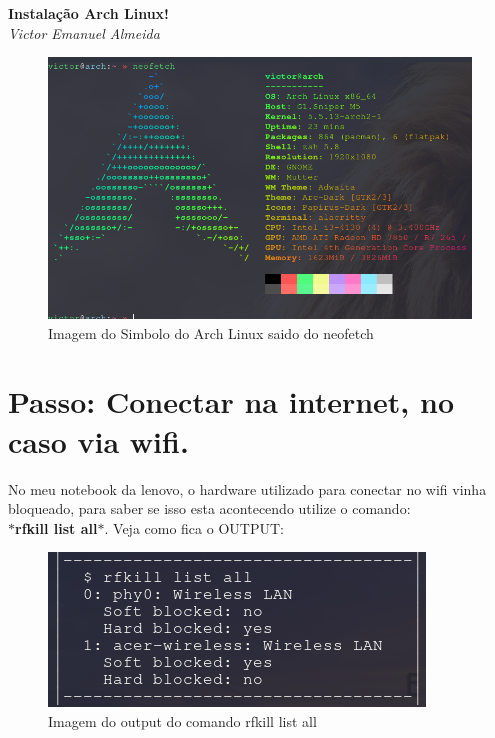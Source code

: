 \documentclass[12pt, a4paper] {article}
\begin{document}
	\begin{titlepage}
	\begin{center}
		\Large\textbf{Instalação Arch Linux!}\\
		\large\textit{Victor Emanuel Almeida}
  	\end{center}
		\begin{figure}[htb]
			\centering
			\includegraphics[width=\linewidth]{images/Simbolo.png}
			\caption{Imagem do Simbolo do Arch Linux saido do neofetch}
			\label{fig:neofetch}
		\end{figure}
		\end{titlepage}
	\section{Passo: Conectar na internet, no caso via wifi.}
		
		No meu notebook da lenovo, o hardware utilizado para conectar no wifi vinha bloqueado, para saber se isso esta acontecendo utilize o comando:\\
	 	\textbf{$\ast$rfkill list all$\ast$}. Veja como fica o OUTPUT:
		\begin{figure}[htb]
			\centering
			\includegraphics[width=\linewidth]{images/1.png}
			\caption{Imagem do output do comando rfkill list all}
			\label{fig:rfkill}
		\end{figure}
\end{document}
